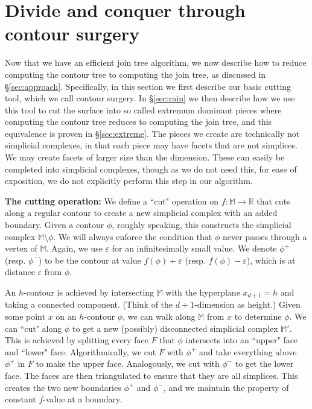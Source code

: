 \documentclass[11pt]{article}
\theoremstyle{definition}
\newcommand{\MM}{\mathbb{M}}
\newcommand{\RR}{\mathbb{R}}
\newcommand{\eps}{\varepsilon}
\newcommand{\Sec}[1]{\hyperref[sec:#1]{\S\ref*{sec:#1}}} %
\newcommand{\XSays}[2]{{
      {$\rule[-0.12cm]{0.2in}{0.5cm}$\fbox{\tt
            #1:} }
      \textcolor{red}{#2}
      \marginpar{\textcolor{blue}{#1}}
      {$\rule[0.1cm]{0.3in}{0.1cm}$\fbox{\tt
            end}$\rule[0.1cm]{0.3in}{0.1cm}$}
      }
   }
\renewcommand{\XSays}[2]{}%
\newcommand{\Ben}[1]{{\XSays{Ben}{#1}}}
\begin{document}
\section{Divide and conquer through contour surgery} \label{sec:surgery}
Now that we have an efficient join tree algorithm, we now describe how to 
reduce computing the contour tree to computing the join tree, as discussed in \Sec{approach}.
Specifically, in this section we first describe our basic cutting tool, which we call contour surgery.
In \Sec{rain} we then describe how we use this tool to cut the surface into so called extremum dominant pieces 
where computing the contour tree reduces to computing the join tree, and this equivalence is proven in \Sec{extreme}. 
The pieces we create are technically not simplicial complexes,
in that each piece may have facets that are not simplices. We may
create facets of larger size than the dimension. These can
easily be completed into simplicial complexes, though as we do not
need this, for ease of exposition, we do not explicitly
perform this step in our algorithm.

{\bf The cutting operation:} We define a ``cut" operation on $f:\MM \rightarrow \RR$ that cuts along a regular contour to create
a new simplicial complex with an added boundary. Given a contour $\phi$, roughly speaking, this constructs the simplicial complex $\MM \setminus \phi$. 
We will always enforce the condition that $\phi$ never passes through a vertex of $\MM$.
Again, we use $\eps$ for an infinitesimally small value. We denote $\phi^+$ (resp. $\phi^-$) to be
the contour at value $f(\phi) + \eps$ (resp. $f(\phi) - \eps$), which is at distance $\eps$
from $\phi$. 

An $h$-contour is achieved by intersecting $\MM$ with the hyperplane $x_{d+1} = h$ and taking a connected component. (Think of the $d+1$-dimension
as height.) Given some point $x$ on an $h$-contour $\phi$, we can walk along $\MM$ from $x$ to determine $\phi$.
We can ``cut" along $\phi$ to get a new (possibly) disconnected simplicial complex $\MM'$. This is achieved
by splitting every face $F$ that $\phi$ intersects into an ``upper" face and ``lower" face. Algorithmically,
we cut $F$ with $\phi^+$ and take everything above $\phi^+$ in $F$ to make the upper face. Analogously, we cut with $\phi^-$ to get the lower face.
The faces are then triangulated to ensure that they are all simplices. 
\Ben{Reviewer wanted clarification on how triangulation is done. Maybe can use bottom-vertex triangulation of Clarkson 88, discussed in Matousek book?}
This creates the two new boundaries $\phi^+$ and $\phi^-$, and we maintain the property of constant $f$-value at a boundary.
\end{document}
